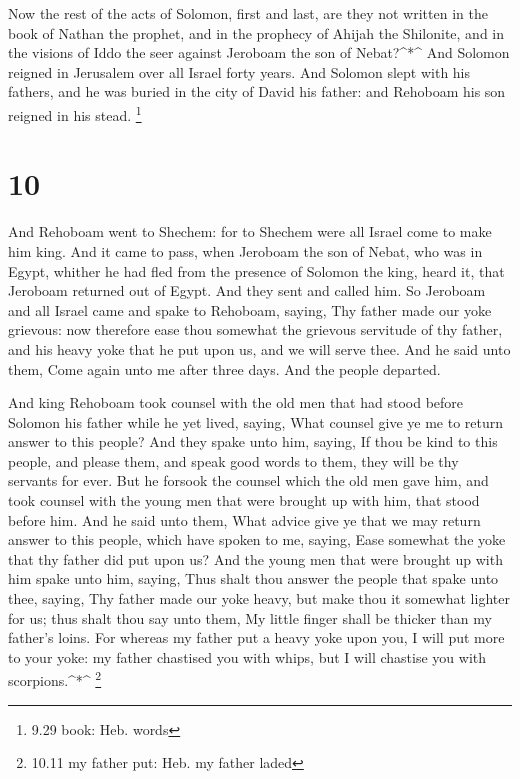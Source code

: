  Now the rest of the acts of Solomon, first and last, are
they not written in the book of Nathan the prophet, and in the prophecy
of Ahijah the Shilonite, and in the visions of Iddo the seer against
Jeroboam the son of Nebat?\^{}*\^{}  And Solomon reigned in
Jerusalem over all Israel forty years.  And Solomon slept
with his fathers, and he was buried in the city of David his father: and
Rehoboam his son reigned in his stead. \footnote{9.29 book: Heb. words}

\hypertarget{section-9}{%
\section{10}\label{section-9}}

 And Rehoboam went to Shechem: for to Shechem were all
Israel come to make him king.  And it came to pass, when
Jeroboam the son of Nebat, who was in Egypt, whither he had fled from
the presence of Solomon the king, heard it, that Jeroboam returned out
of Egypt.  And they sent and called him. So Jeroboam and all
Israel came and spake to Rehoboam, saying,  Thy father made
our yoke grievous: now therefore ease thou somewhat the grievous
servitude of thy father, and his heavy yoke that he put upon us, and we
will serve thee.  And he said unto them, Come again unto me
after three days. And the people departed.

 And king Rehoboam took counsel with the old men that had
stood before Solomon his father while he yet lived, saying, What counsel
give ye me to return answer to this people?  And they spake
unto him, saying, If thou be kind to this people, and please them, and
speak good words to them, they will be thy servants for ever.
 But he forsook the counsel which the old men gave him, and
took counsel with the young men that were brought up with him, that
stood before him.  And he said unto them, What advice give
ye that we may return answer to this people, which have spoken to me,
saying, Ease somewhat the yoke that thy father did put upon us?
 And the young men that were brought up with him spake unto
him, saying, Thus shalt thou answer the people that spake unto thee,
saying, Thy father made our yoke heavy, but make thou it somewhat
lighter for us; thus shalt thou say unto them, My little finger shall be
thicker than my father's loins.  For whereas my father put
a heavy yoke upon you, I will put more to your yoke: my father chastised
you with whips, but I will chastise you with scorpions.\^{}*\^{}
\footnote{10.11 my father put: Heb. my father laded}

